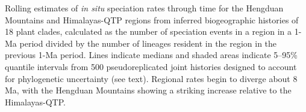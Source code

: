 \label{fig:speciation}
Rolling estimates of \textit{in situ} speciation rates through time for the Hengduan Mountains and Himalayas-QTP regions from inferred biogeographic histories of 18 plant clades, calculated as the number of speciation events in a region in a 1-Ma period divided by the number of lineages resident in the region in the previous 1-Ma period. Lines indicate medians and shaded areas indicate 5--95\% quantile intervals from 500 pseudoreplicated joint histories designed to account for phylogenetic uncertainty (see text). Regional rates begin to diverge about 8 Ma, with the Hengduan Mountains showing a striking increase relative to the Himalayas-QTP.